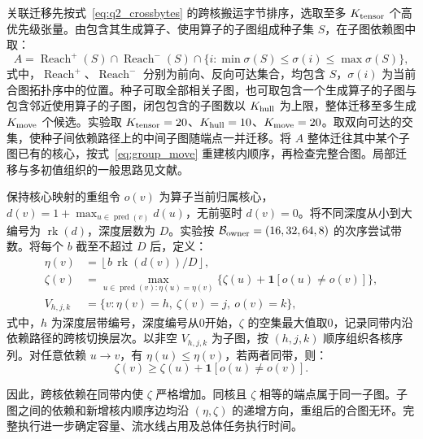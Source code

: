 关联迁移先按式~\eqref{eq:q2_crossbytes} 的跨核搬运字节排序，选取至多 $K_{\rm tensor}$ 个高优先级张量。由包含其生成算子、使用算子的子图组成种子集 $S$，在子图依赖图中取：
\begin{equation}
 A=\operatorname{Reach}^{+}(S)\cap\operatorname{Reach}^{-}(S)
       \cap\{i:\min\sigma(S)\le\sigma(i)\le\max\sigma(S)\},
 \label{eq:residency_hull}
\end{equation}
\noindent 式中，$\operatorname{Reach}^{+}$、$\operatorname{Reach}^{-}$ 分别为前向、反向可达集合，均包含 $S$，$\sigma(i)$ 为当前合图拓扑序中的位置。种子可取全部相关子图，也可取包含一个生成算子的子图与包含邻近使用算子的子图，闭包包含的子图数以 $K_{\rm hull}$ 为上限，整体迁移至多生成 $K_{\rm move}$ 个候选。实验取 $K_{\rm tensor}=20$、$K_{\rm hull}=10$、$K_{\rm move}=20$。取双向可达的交集，使种子间依赖路径上的中间子图随端点一并迁移。将 $A$ 整体迁往其中某个子图已有的核心，按式~\eqref{eq:group_move} 重建核内顺序，再检查完整合图。局部迁移与多初值组织的一般思路见文献\cite{A42}。

保持核心映射的重组令 $o(v)$ 为算子当前归属核心，$d(v)=1+\max_{u\in\operatorname{pred}(v)}d(u)$，无前驱时 $d(v)=0$。将不同深度从小到大编号为 $\operatorname{rk}(d)$，深度层数为 $D$。实验按 $\mathcal B_{\rm owner}=(16,32,64,8)$ 的次序尝试带数。将每个 $b$ 截至不超过 $D$ 后，定义：
\begin{equation}
 \begin{aligned}
 \eta(v)&=\left\lfloor b\,\operatorname{rk}(d(v))/D\right\rfloor,\\
 \zeta(v)&=\max_{u\in\operatorname{pred}(v):\eta(u)=\eta(v)}
       \{\zeta(u)+\mathbf1[o(u)\ne o(v)]\},\\
 V_{h,j,k}&=\{v:\eta(v)=h,\ \zeta(v)=j,\ o(v)=k\},
 \end{aligned}
 \label{eq:owner_bands}
\end{equation}
\noindent 式中，$h$ 为深度层带编号，深度编号从0开始，$\zeta$ 的空集最大值取0，记录同带内沿依赖路径的跨核切换层次。以非空 $V_{h,j,k}$ 为子图，按 $(h,j,k)$ 顺序组织各核序列。对任意依赖 $u\to v$，有 $\eta(u)\le\eta(v)$，若两者同带，则：
\[
 \zeta(v)\ge\zeta(u)+\mathbf1[o(u)\ne o(v)].
\]

因此，跨核依赖在同带内使 $\zeta$ 严格增加。同核且 $\zeta$ 相等的端点属于同一子图。子图之间的依赖和新增核内顺序边均沿 $(\eta,\zeta)$ 的递增方向，重组后的合图无环。完整执行进一步确定容量、流水线占用及总体任务执行时间。

